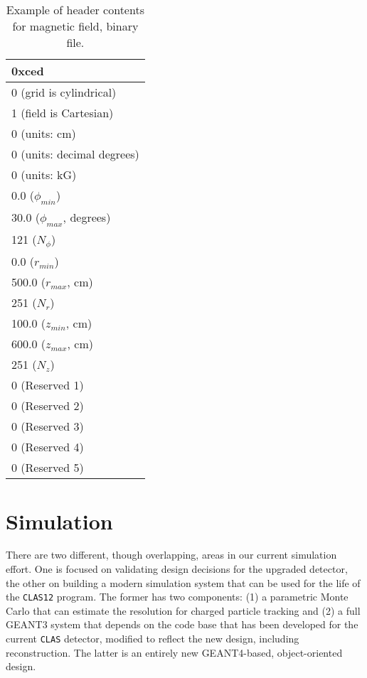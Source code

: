\begin{table}[b!]
\begin{center}
\begin{tabular}{|l|}\hline
0xced  \\[2pt] \hline
0 (grid is cylindrical) \\[2pt] \hline
1 (field is Cartesian) \\[2pt] \hline
0 (units: cm) \\[2pt] \hline
0 (units: decimal degrees) \\[2pt] \hline
0 (units: kG) \\[2pt] \hline
0.0 ($\phi_{min}$) \\[2pt] \hline
30.0 ($\phi_{max}$, degrees) \\[2pt] \hline
121 ($N_\phi$) \\[2pt] \hline
0.0 ($r_{min}$) \\[2pt] \hline
500.0 ($r_{max}$, cm) \\[2pt] \hline
251 ($N_r$) \\[2pt] \hline
100.0 ($z_{min}$, cm) \\[2pt] \hline
600.0 ($z_{max}$, cm) \\[2pt] \hline
251 ($N_z$) \\[2pt] \hline
0 (Reserved 1) \\[2pt] \hline
0 (Reserved 2) \\[2pt] \hline
0 (Reserved 3) \\[2pt] \hline
0 (Reserved 4) \\[2pt] \hline
0 (Reserved 5) \\[2pt] \hline
\end{tabular}
\caption{Example of header contents for magnetic field, binary file.}\label{magfieldfileheader2}
\end{center}
\end{table}




\section{Simulation}

There are two different, though overlapping, areas in our current simulation 
effort. One is focused on validating design decisions for the upgraded 
detector, the other on building a modern simulation system that can be used 
for the life of the {\tt CLAS12} program. The former has two components: (1) a 
parametric Monte Carlo that can estimate the resolution for charged particle 
tracking and (2) a full GEANT3 system that depends on the code base that has 
been developed for the current {\tt CLAS} detector, modified to reflect the 
new design, including reconstruction. The latter is an entirely new 
GEANT4-based, object-oriented design.

